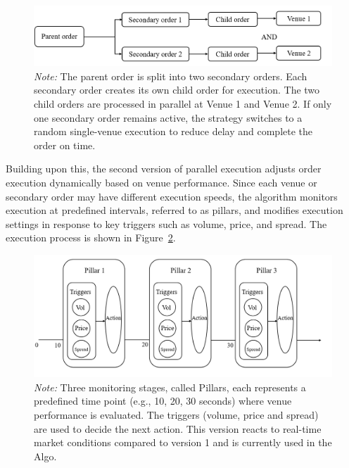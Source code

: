 \begin{figure}[h]
    \centering
    \includegraphics[width=0.8\linewidth]{figures/venue_submission_2.png}
    \caption{Parallel execution strategy version 1}
    \caption*{\textit{Note:} The parent order is split into two secondary orders. Each secondary order creates its own child order for execution. The two child orders are processed in parallel at Venue 1 and Venue 2. If only one secondary order remains active, the strategy switches to a random single-venue execution to reduce delay and complete the order on time.}
    \label{fig:venue_submission_2}
\end{figure}

Building upon this, the second version of parallel execution adjusts order execution dynamically based on venue performance. Since each venue or secondary order may have different execution speeds, the algorithm monitors execution at predefined intervals, referred to as pillars, and modifies execution settings in response to key triggers such as volume, price, and spread. The execution process is shown in Figure~\ref{fig:venue_submission_3}.
\begin{figure}[h]
    \centering
    \includegraphics[width=0.8\linewidth]{figures/venue_submission_3.png}
    \caption{Parallel execution strategy version 2}
    \caption*{\textit{Note:} Three monitoring stages, called Pillars, each represents a predefined time point (e.g., 10, 20, 30 seconds) where venue performance is evaluated. The triggers (volume, price and spread) are used to decide the next action. This version reacts to real-time market conditions compared to version 1 and is currently used in the Algo.}
    \label{fig:venue_submission_3}
\end{figure}



